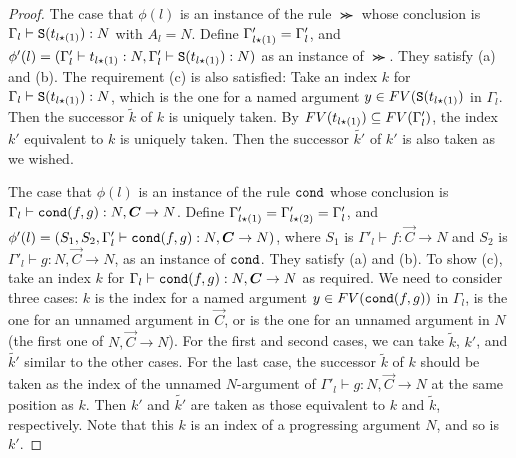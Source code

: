 \begin{proof}
  The case that $\phi(l)$ is an instance of the rule $\Succ$
  whose conclusion is $\Gamma_l\vdash {\tt S}(t_{l{\star}(1)}):N$ with $A_l=N$.
  Define $\Gamma'_{l{\star}(1)} = \Gamma'_l$, and 
  $\phi'(l) = (\Gamma'_l\vdash t_{l{\star}(1)}:N, \Gamma'_l\vdash {\tt S}(t_{l{\star}(1)}):N)$
  as an instance of $\Succ$. They satisfy (a) and (b). 
  The requirement (c) is also satisfied:
  Take an index $k$ for $\Gamma_l\vdash {\tt S}(t_{l{\star}(1)}): N$,
  which is the one for a named argument $y \in {{\relax FV}}({\tt S}(t_{l{\star}(1)})$ in $\Gamma_l$.
  Then the successor $\tilde{k}$ of $k$ is uniquely taken.  
  By ${{\relax FV}}(t_{l{\star}(1)}) \subseteq {{\relax FV}}(\Gamma'_l)$, the index $k'$ equivalent to $k$ is uniquely taken. 
  Then the successor $\tilde{k'}$ of $k'$ is also taken as we wished. 
  
  The case that $\phi(l)$ is an instance of the rule ${\tt cond}$
  whose conclusion is $\Gamma_l\vdash \cond(f,g):N,\vec{C}\to N$. 
  Define $\Gamma'_{l{\star}(1)} = \Gamma'_{l{\star}(2)} = \Gamma'_l$, and 
  $\phi'(l) = (S_1,S_2, \Gamma'_l\vdash \cond(f,g):N,\vec{C}\to N)$,
  where $S_1$ is $\Gamma'_l\vdash f:\vec{C}\to N$ and $S_2$ is $\Gamma'_l \vdash g:N,\vec{C}\to N$, 
  as an instance of ${\tt cond}$. They satisfy (a) and (b). 
  To show (c), take an index $k$ for $\Gamma_l\vdash \cond(f,g): N,\vec{C}\to N$ as required. 
  We need to consider three cases:
  $k$ is the index for a named argument $y \in {{\relax FV}}({\tt cond}(f,g))$ in $\Gamma_l$,
  is the one for an unnamed argument in $\vec{C}$, or
  is the one for an unnamed argument in $N$ (the first one of $N,\vec{C}\to N$). 
  For the first and second cases, we can take $\tilde{k}$, $k'$, and $\tilde{k'}$
  similar to the other cases.
  For the last case, the successor $\tilde{k}$ of $k$ should be taken
  as the index of the unnamed $N$-argument of $\Gamma'_l \vdash g:N,\vec{C}\to N$
  at the same position as $k$. 
  Then $k'$ and $\tilde{k'}$ are taken as those equivalent to $k$ and $\tilde{k}$, respectively.
  Note that this $k$ is an index of a progressing argument $N$, and so is $k'$. 
\end{proof}



